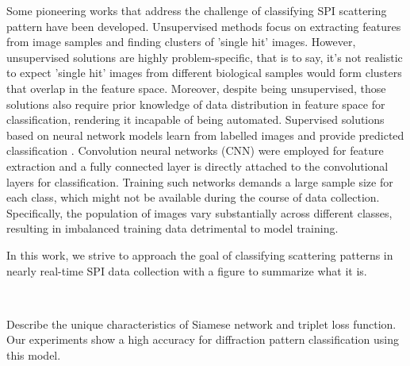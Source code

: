 Some pioneering works that address the challenge of classifying SPI scattering
pattern have been developed.  Unsupervised methods
\cite{yoonUnsupervisedClassificationSingleparticle2011,
giannakisSymmetriesImageFormation2012,schwanderSymmetriesImageFormation2012,
yoonNovelAlgorithmsCoherent2012,
andreassonAutomatedIdentificationClassification2014,
bobkovSortingAlgorithmsSingleparticle2015a} focus on extracting features from
image samples and finding clusters of 'single hit' images.  However,
unsupervised solutions are highly problem-specific, that is to say, it's not
realistic to expect 'single hit' images from different biological samples would
form clusters that overlap in the feature space.  Moreover, despite being
unsupervised, those solutions also require prior knowledge of data distribution
in feature space for classification, rendering it incapable of being automated.
Supervised solutions based on neural network models learn from labelled images
and provide predicted classification
\cite{shiEvaluationPerformanceClassification2019,
ignatenkoClassificationDiffractionPatterns2021}.  Convolution neural networks
(CNN) were employed for feature extraction and a fully connected layer is
directly attached to the convolutional layers for classification.  Training such
networks demands a large sample size for each class, which might not be
available during the course of data collection.  Specifically, the population of
images vary substantially across different classes, resulting in imbalanced
training data detrimental to model training.  



In this work, we strive to approach the goal of classifying scattering patterns
in nearly real-time SPI data collection {\color{gray} with a figure to summarize
what it is}.  






\

Describe the unique characteristics of Siamese network and triplet loss
function.  Our experiments show a high accuracy for diffraction pattern
classification using this model.
